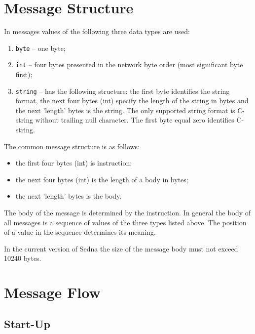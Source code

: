 \documentclass[a4paper,12pt]{article}
\newenvironment{citemize}
{\begin{itemize}
  \setlength{\itemsep}{0pt}
  \setlength{\parskip}{0pt}
  \setlength{\parsep}{0pt}}
{\end{itemize}}
\begin{document}
\section{Message Structure}
\label{sec:MessageStructure}

In messages values of the following three data types are used:
\begin{enumerate}
\item\verb!byte! -- one byte;
\item\verb!int! -- four bytes presented in the network byte order (most
significant byte first);
\item\verb!string! -- has the following structure: the first byte identifies the
string format, the next four bytes (int) specify the length of the string in
bytes and the next 'length' bytes is the string. The only supported string
format is C-string without trailing null character. The first byte equal zero
identifies C-string.
\end{enumerate}

The common message structure is as follows:
\begin{citemize}
\item the first four bytes (int) is instruction;
\item the next four bytes (int) is the length of a body in bytes;
\item the next 'length' bytes is the body.
\end{citemize}
The body of the message is determined by the instruction. In general the body of
all messages is a sequence of values of the three types listed above. The
position of a value in the sequence determines its meaning.

In the current version of Sedna the size of the message body must not exceed
10240 bytes.

\newpage


\section{Message Flow}
\label{sec:MessageFlow}

\subsection{Start-Up}
\end{document}
